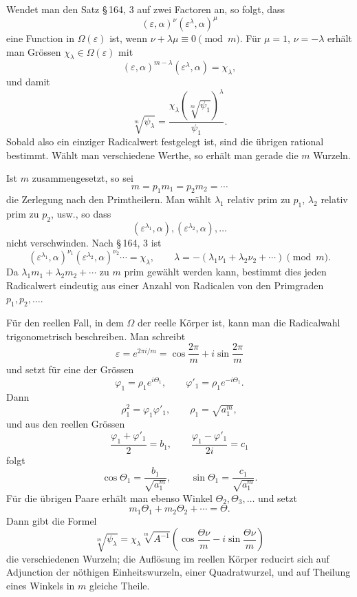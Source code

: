 \documentclass[11pt]{article}
\begin{document}
Wendet man den Satz \S\,164, 3 auf zwei Factoren an, so folgt, dass
\[
        (\varepsilon,\alpha)^\nu(\varepsilon^\lambda,
        \alpha)^\mu
\]
eine Function in $\Omega(\varepsilon)$ ist, wenn $\nu+\lambda\mu\equiv0\pmod m$. Für $\mu=1$, $\nu=-\lambda$ erhält man Grössen $\chi_\lambda\in\Omega(\varepsilon)$ mit
\[
        (\varepsilon,\alpha)^{m-\lambda}
        (\varepsilon^\lambda,
        \alpha)=\chi_\lambda,
\]
und damit
\[
        \sqrt[m]{\psi_\lambda}=
        \frac{\chi_\lambda\left(\sqrt[m]{\psi_1}\right)^\lambda}{\psi_1}. \tag{4}
\]
Sobald also ein einziger Radicalwert festgelegt ist, sind die übrigen rational bestimmt. Wählt man verschiedene Werthe, so erhält man gerade die $m$ Wurzeln.

Ist $m$ zusammengesetzt, so sei
\[
        m=p_1m_1=p_2m_2=\cdots
\]
die Zerlegung nach den Primtheilern. Man wählt $\lambda_1$ relativ prim zu $p_1$, $\lambda_2$ relativ prim zu $p_2$, usw., so dass
\[
        (\varepsilon^{\lambda_1},\alpha),
        (\varepsilon^{\lambda_2},\alpha),
        \ldots
\]
nicht verschwinden. Nach \S\,164, 3 ist
\[
        (\varepsilon^{\lambda_1},\alpha)^{\nu_1}
        (\varepsilon^{\lambda_2},\alpha)^{\nu_2}\cdots=\chi_\lambda,
        \qquad
        \lambda=-(\lambda_1\nu_1+
        \lambda_2\nu_2+
        \cdots) \pmod m.                                                \tag{5--6}
\]
Da $\lambda_1m_1+
\lambda_2m_2+
\cdots$ zu $m$ prim gewählt werden kann, bestimmt dies jeden Radicalwert eindeutig aus einer Anzahl von Radicalen von den Primgraden $p_1,p_2,
\ldots$.

Für den reellen Fall, in dem $\Omega$ der reelle Körper ist, kann man die Radicalwahl trigonometrisch beschreiben. Man schreibt
\[
        \varepsilon=e^{2\pi i/m}=
        \cos\frac{2\pi}{m}+i\sin\frac{2\pi}{m}
\]
und setzt für eine der Grössen
\[
        \varphi_1=\rho_1 e^{i\Theta_1},
        \qquad
        \varphi'_1=\rho_1 e^{-i\Theta_1}.                              \tag{9}
\]
Dann
\[
        \rho_1^2=\varphi_1\varphi'_1,
        \qquad
        \rho_1=\sqrt{a_1^{m}},                                         \tag{11--13}
\]
und aus den reellen Grössen
\[
        \frac{\varphi_1+\varphi'_1}{2}=b_1,
        \qquad
        \frac{\varphi_1-\varphi'_1}{2i}=c_1                             \tag{14}
\]
folgt
\[
        \cos\Theta_1=\frac{b_1}{\sqrt{a_1^m}},
        \qquad
        \sin\Theta_1=\frac{c_1}{\sqrt{a_1^m}}.                           \tag{15}
\]
Für die übrigen Paare erhält man ebenso Winkel $\Theta_2,
\Theta_3,
\ldots$ und setzt
\[
        m_1\Theta_1+m_2\Theta_2+
        \cdots=\Theta.                                                  \tag{16}
\]
Dann gibt die Formel
\[
        \sqrt[m]{\psi_\lambda}
        =\chi_\lambda \sqrt[m]{A^{-1}}
        \left(\cos\frac{\Theta\nu}{m}-i\sin\frac{\Theta\nu}{m}\right)     \tag{21}
\]
die verschiedenen Wurzeln; die Auflösung im reellen Körper reducirt sich auf Adjunction der nöthigen Einheitswurzeln, einer Quadratwurzel, und auf Theilung eines Winkels in $m$ gleiche Theile.
\end{document}
